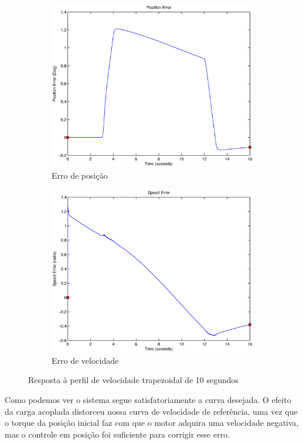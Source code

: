 \documentclass{article}
\begin{document}
\begin{figure}[H]
\begin{subfigure}{0.32\textwidth}
		\includegraphics[width=\linewidth]{matlab/ep4}
		\caption{Erro de posição}
	\end{subfigure}
	\begin{subfigure}{0.32\textwidth}
		\includegraphics[width=\linewidth]{matlab/ew4}
		\caption{Erro de velocidade}
	\end{subfigure}
	\caption{Resposta à perfil de velocidade trapezoidal de 10 segundos}	
	\label{fig:sim4res}
\end{figure}

Como podemos ver o sistema segue satisfatoriamente a curva desejada. O efeito da carga acoplada distorceu nossa curva de velocidade de referência, uma vez que o torque da posição inicial faz com que o motor adquira uma velocidade negativa, mas o controle em posição foi suficiente para corrigir esse erro. 
\end{document}
